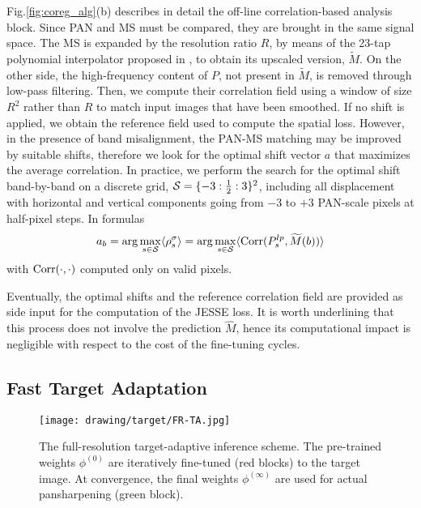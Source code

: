 \documentclass[journal]{IEEEtran}
\newcommand{\hM} {\widehat{M}}
\newcommand{\tM} {\widetilde{M}}
\begin{document}
Fig.\ref{fig:coreg_alg}(b) describes in detail the off-line correlation-based analysis block.
Since PAN and MS must be compared, they are brought in the same signal space.
The MS is expanded by the resolution ratio $R$, by means of the 23-tap polynomial interpolator proposed in \cite{Aiazzi2002}, to obtain its upscaled version, $\widetilde{M}$.
On the other side, the high-frequency content of $P$, not present in $\widetilde{M}$, is removed through low-pass filtering.
Then, we compute their correlation field using a window of size $R^2$ rather than $R$ to match input images that have been smoothed.
If no shift is applied, we obtain the reference field used to compute the spatial loss.
However, in the presence of band misalignment, the PAN-MS matching may be improved by suitable shifts,
therefore we look for the optimal shift vector $a$ that maximizes the average correlation.
In practice, we perform the search for the optimal shift band-by-band on a discrete grid,
${\cal S}=\{-3:\frac{1}{2}:3\}^2$,
including all displacement with horizontal and vertical components going from $-3$ to $+3$ PAN-scale pixels at half-pixel steps.
In formulas
\begin{equation}
    a_b = \arg\max_{s \in {\cal S}} \langle \rho^{\sigma}_s \rangle = \arg\max_{s \in {\cal S}} \langle {\rm Corr}(P^{lp}_s,\tM(b)) \rangle
    \label{eq:coregatloss}
\end{equation}
with ${\rm Corr}(\cdot,\cdot)$ computed only on valid pixels.

Eventually, the optimal shifts and the reference correlation field are provided as side input for the computation of the JESSE loss.
It is worth underlining that this process does not involve the prediction $\hM$,
hence its computational impact is negligible with respect to the cost of the fine-tuning cycles.

\subsection{Fast Target Adaptation}
\label{sec:TA}

\begin{figure}
\centering
\texttt{[image: drawing/target/FR-TA.jpg]} \\
\caption{The full-resolution target-adaptive inference scheme.
The pre-trained weights $\phi^{(0)}$ are iteratively fine-tuned (red blocks) to the target image.
At convergence, the final weights $\phi^{(\infty)}$ are used for actual pansharpening (green block).
}
\label{fig:TA}
\end{figure}
\end{document}

